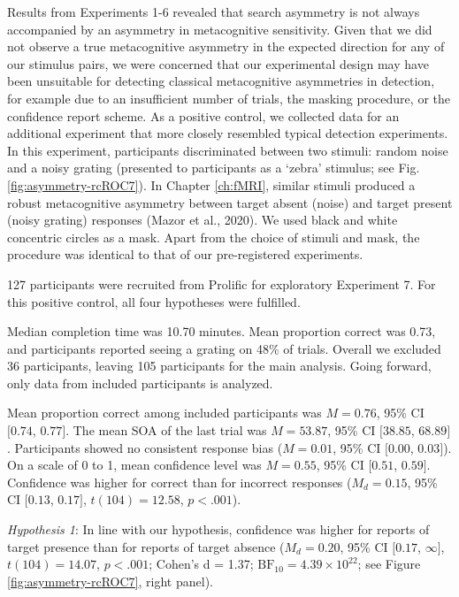 \documentclass[12pt,twoside]{reedthesis}
\begin{document}
Results from Experiments 1-6 revealed that search asymmetry is not always accompanied by an asymmetry in metacognitive sensitivity. Given that we did not observe a true metacognitive asymmetry in the expected direction for any of our stimulus pairs, we were concerned that our experimental design may have been unsuitable for detecting classical metacognitive asymmetries in detection, for example due to an insufficient number of trials, the masking procedure, or the confidence report scheme. As a positive control, we collected data for an additional experiment that more closely resembled typical detection experiments. In this experiment, participants discriminated between two stimuli: random noise and a noisy grating (presented to participants as a `zebra' stimulus; see Fig. \ref{fig:asymmetry-rcROC7}). In Chapter \ref{ch:fMRI}, similar stimuli produced a robust metacognitive asymmetry between target absent (noise) and target present (noisy grating) responses (Mazor et al., 2020). We used black and white concentric circles as a mask. Apart from the choice of stimuli and mask, the procedure was identical to that of our pre-registered experiments.

127 participants were recruited from Prolific for exploratory Experiment 7. For this positive control, all four hypotheses were fulfilled.

Median completion time was 10.70 minutes. Mean proportion correct was 0.73, and participants reported seeing a grating on 48\% of trials. Overall we excluded 36 participants, leaving 105 participants for the main analysis. Going forward, only data from included participants is analyzed.

Mean proportion correct among included participants was \(M = 0.76\), 95\% CI \([0.74\), \(0.77]\). The mean SOA of the last trial was \(M = 53.87\), 95\% CI \([38.85\), \(68.89]\). Participants showed no consistent response bias (\(M = 0.01\), 95\% CI \([0.00\), \(0.03]\)). On a scale of 0 to 1, mean confidence level was \(M = 0.55\), 95\% CI \([0.51\), \(0.59]\). Confidence was higher for correct than for incorrect responses (\(M_d = 0.15\), 95\% CI \([0.13\), \(0.17]\), \(t(104) = 12.58\), \(p < .001\)).

\emph{Hypothesis 1}: In line with our hypothesis, confidence was higher for reports of target presence than for reports of target absence (\(M_d = 0.20\), 95\% CI \([0.17\), \(\infty]\), \(t(104) = 14.07\), \(p < .001\); Cohen's d = 1.37; \(\mathrm{BF}_{\textrm{10}} = 4.39 \times 10^{22}\); see Figure \ref{fig:asymmetry-rcROC7}, right panel).
\end{document}
